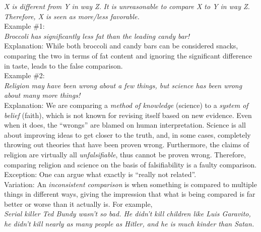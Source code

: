 \documentclass[a4paper,12pt,single,pdftex]{scrartcl}
\begin{document}
    
      {\em X is different from Y in way Z.} \newline
{\em It is unreasonable to compare X to Y in way Z.} \newline
{\em Therefore, X is seen as more/less favorable.}
    \\

    
      Example \#1:
    \\

    
      {\em Broccoli has significantly less fat than the leading candy bar!}
    \\

    
      Explanation: While both broccoli and candy bars can be considered snacks, comparing the two in terms of fat content and ignoring the significant difference in taste, leads to the false comparison.
    \\

    
      Example \#2:
    \\

    
      {\em Religion may have been wrong about a few things, but science has been wrong about many more things!}
    \\

    
      Explanation: We are comparing a {\it method of knowledge}  (science) to a {\it system of belief} (faith), which is not known for revising itself based on new evidence.  Even when it does, the “wrongs” are blamed on human interpretation.  Science is all about improving ideas to get closer to the truth, and, in some cases, completely throwing out theories that have been proven wrong.  Furthermore, the claims of religion are virtually all {\it unfalsifiable}, thus cannot be proven wrong.  Therefore, comparing religion and science on the basis of falsifiability is a faulty comparison.
    \\

    
      Exception: One can argue what exactly is “really not related”.
    \\

    
      Variation: An {\em inconsistent comparison} is when something is compared to multiple things in different ways, giving the impression that what is being compared is far better or worse than it actually is. For example,
    \\

    
      {\em Serial killer Ted Bundy wasn’t so bad. He didn’t kill children like Luis Garavito, he didn’t kill nearly as many people as Hitler, and he is much kinder than Satan.}
    \\
\end{document}
